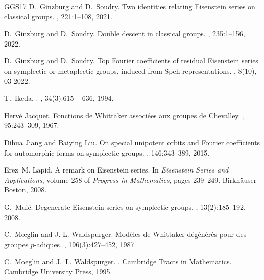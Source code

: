 \documentclass[11pt,notitlepage]{amsart}
\theoremstyle{definition}
\theoremstyle{remark}
\begin{document}
\begin{thebibliography}{GGS17}
D.~Ginzburg and D.~Soudry.
\newblock Two identities relating {Eisenstein} series on classical groups.
, 221:1--108, 2021.

D.~Ginzburg and D.~Soudry.
\newblock Double descent in classical groups.
, 235:1--156, 2022.

D.~Ginzburg and D.~Soudry.
\newblock Top {Fourier} coefficients of residual {Eisenstein} series on
  symplectic or metaplectic groups, induced from {Speh} representations.
, 8(10), 03 2022.

T.~Ikeda.
.
, 34(3):615 -- 636,
  1994.

Herv\'e Jacquet.
\newblock Fonctions de {Whittaker} associ\'ees aux groupes de {Chevalley}.
,
  95:243--309, 1967.

Dihua Jiang and Baiying Liu.
\newblock On special unipotent orbits and {Fourier} coefficients for
  automorphic forms on symplectic groups.
, 146:343--389, 2015.

Erez~M. Lapid.
\newblock A remark on {Eisenstein} series.
\newblock In {\em {Eisenstein} Series and Applications}, volume 258 of {\em
  Progress in Mathematics}, pages 239--249. Birkh{\"a}user Boston, 2008.

G.~Muić.
\newblock Degenerate {Eisenstein} series on symplectic groups.
, 13(2):185--192, 2008.

C.~M{\oe}glin and J.-L. Waldspurger.
\newblock Mod{\`e}les de {Whittaker} d{\'e}g{\'e}n{\'e}r{\'e}s pour des groupes
  $p$-adiques.
, 196(3):427--452, 1987.

C.~Moeglin and J.~L. Waldspurger.
.
\newblock Cambridge Tracts in Mathematics. Cambridge University Press, 1995.

\end{thebibliography}
\end{document}
